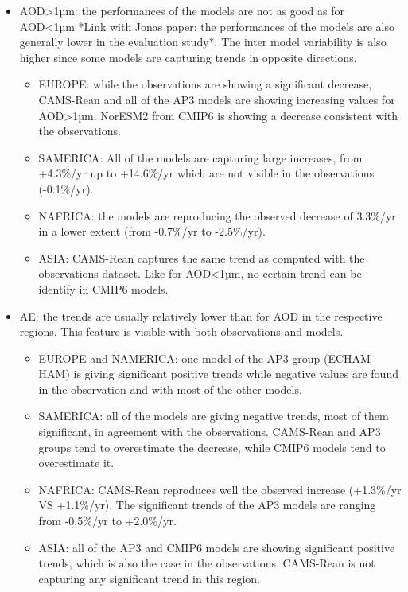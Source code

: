 \documentclass[journal abbreviation, manuscript]{copernicus}
\begin{document}
\begin{itemize}
\begin{itemize}
       \end{itemize}
 \item AOD>1µm: the performances of the models are not as good as for AOD<1µm *Link with Jonas paper: the performances of the models are also generally lower in the evaluation study*. The inter model variability is also higher since some models are capturing trends in opposite directions.
       \begin{itemize}
        \item EUROPE: while the observations are showing a significant decrease, CAMS-Rean and all of the AP3 models are showing increasing values for AOD>1µm. NorESM2 from CMIP6 is showing a decrease consistent with the observations.
        \item SAMERICA: All of the models are capturing large increases, from +4.3\%/yr up to +14.6\%/yr  which are not visible in the observations (-0.1\%/yr). 
        \item NAFRICA: the models are reproducing the observed decrease of 3.3\%/yr in a lower extent (from -0.7\%/yr to -2.5\%/yr). 
        \item ASIA: CAMS-Rean captures the same trend as computed with the observations dataset. Like for AOD<1µm, no certain trend can be identify in CMIP6 models.
       \end{itemize}
 \item AE: the trends are usually relatively lower than for AOD in the respective regions. This feature is visible with both observations and models.
       \begin{itemize}
        \item EUROPE and NAMERICA: one model of the AP3 group (ECHAM-HAM) is giving significant positive trends while negative values are found in the observation and with most of the other models.
        \item SAMERICA: all of the models are giving negative trends, most of them significant, in agreement with the observations. CAMS-Rean and AP3 groups tend to overestimate the decrease, while CMIP6 models tend to overestimate it.
        \item NAFRICA: CAMS-Rean reproduces well the observed increase (+1.3\%/yr VS +1.1\%/yr). The significant trends of the AP3 models are ranging from -0.5\%/yr to +2.0\%/yr.
        \item ASIA: all of the AP3 and CMIP6 models are showing significant positive trends, which is also the case in the observations. CAMS-Rean is not capturing any significant trend in this region.
       \end{itemize}

\end{itemize}
\end{document}
